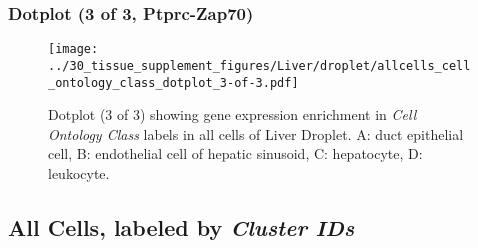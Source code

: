 \clearpage

\subsubsection{Dotplot (3 of 3, Ptprc-Zap70)}
\begin{figure}[h]
\centering
\texttt{[image: ../30\_tissue\_supplement\_figures/Liver/droplet/allcells\_cell\_ontology\_class\_dotplot\_3-of-3.pdf]}

\caption{ Dotplot (3 of 3)  showing gene expression enrichment in \emph{Cell Ontology Class} labels in all cells of Liver Droplet. A: duct epithelial cell, B: endothelial cell of hepatic sinusoid, C: hepatocyte, D: leukocyte.}
\end{figure}


\clearpage

\subsection{All Cells, labeled by \emph{Cluster IDs}}
